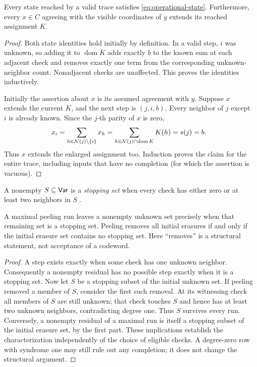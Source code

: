 \begin{lem}\label{lem:core-invariant}
Every state reached by a valid trace satisfies
\eqref{eq:operational-state}. Furthermore, every $x\in C$ agreeing with
the visible coordinates of $y$ extends its reached assignment $K$.
\end{lem}
\begin{proof}
Both state identities hold initially by definition. In a valid step,
$i$ was unknown, so adding it to $\operatorname{dom}K$ adds exactly $b$
to the known sum at each adjacent check and removes exactly one term
from the corresponding unknown-neighbor count. Nonadjacent checks
are unaffected. This proves the identities inductively.

Initially the assertion about $x$ is its assumed agreement with $y$.
Suppose $x$ extends the current $K$, and the next step is $(j,i,b)$.
Every neighbor of $j$ except $i$ is already known. Since the $j$-th
parity of $x$ is zero,
\[
 x_i=\sum_{h\in\mathcal{N}(j)\setminus\{i\}}x_h
     =\sum_{h\in\mathcal{N}(j)\cap\operatorname{dom}K}K(h)=s(j)=b.
\]
Thus $x$ extends the enlarged assignment too. Induction proves the
claim for the entire trace, including inputs that have no completion
(for which the assertion is vacuous).
\end{proof}

A nonempty $S\subseteq\mathsf{Var}$ is a \emph{stopping set} when every check
has either zero or at least two neighbors in $S$ \cite{DiEtAl2002Stopping}.
\begin{prop}\label{prop:core-stopping}
A maximal peeling run leaves a nonempty unknown set precisely when that
remaining set is a stopping set. Peeling removes all initial erasures
if and only if the initial erasure set contains no stopping set.
Here ``removes'' is a structural statement, not acceptance of a codeword.
\end{prop}
\begin{proof}
A step exists exactly when some check has one unknown neighbor.
Consequently a nonempty residual has no possible step exactly when it
is a stopping set. Now let $S$ be a stopping subset of the initial
unknown set. If peeling removed a member of $S$, consider the first
such removal. At its witnessing check all members of $S$ are still
unknown; that check touches $S$ and hence has at least two unknown
neighbors, contradicting degree one. Thus $S$ survives every run.
Conversely, a nonempty residual of a maximal run is itself a stopping
subset of the initial erasure set, by the first part. These implications
establish the characterization independently of the choice of eligible
checks. A degree-zero row with syndrome one may still rule out any
completion; it does not change the structural argument.
\end{proof}


